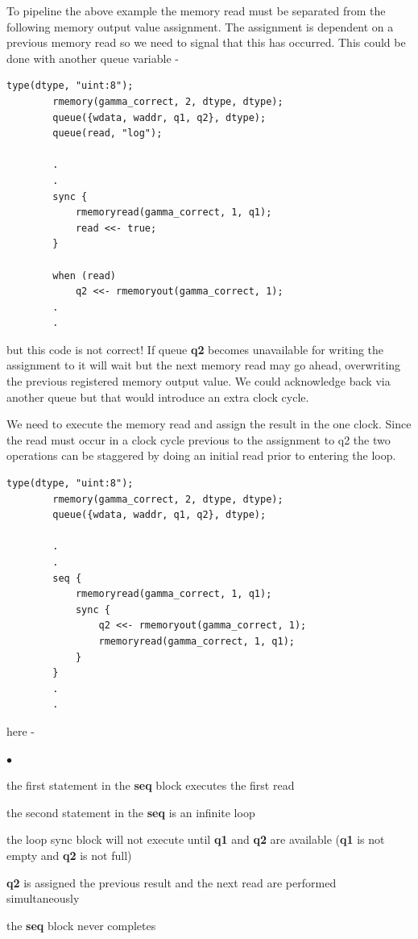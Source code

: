 \documentclass[10pt,a4paper,twoside,fleqn]{article}
\newcommand{\blist}{\begin{list}{$\bullet$}{\setlength{\itemsep}{-5pt}\setlength{\topsep}{-5pt}}}
\newcommand{\blend}{\end{list}}
\newcommand{\var}[1]{{\bf #1}} %
\begin{document}
    To pipeline the above example the memory read must be separated from the
    following memory output value assignment. The assignment is dependent on
    a previous memory read so we need to signal that this has occurred. This
    could be done with another queue variable -
    \begin{lstlisting}[language=threepl]
        type(dtype, "uint:8");
        rmemory(gamma_correct, 2, dtype, dtype);
        queue({wdata, waddr, q1, q2}, dtype);
        queue(read, "log");
                
        .
        .
        sync {
            rmemoryread(gamma_correct, 1, q1);
            read <<- true;
        }
        
        when (read)
            q2 <<- rmemoryout(gamma_correct, 1);
        .
        .
    \end{lstlisting}
    but this code is not correct! If queue \var{q2} becomes unavailable for
    writing the assignment to it will wait but the next memory read may go
    ahead, overwriting the previous registered memory output value. We could
    acknowledge back via another queue but that would introduce an extra clock
    cycle.
    
    We need to execute the memory read and assign the result in the one clock.
    Since the read must occur in a clock cycle previous to the assignment to q2
    the two operations can be staggered by doing an initial read prior to
    entering the loop.
    
    \begin{lstlisting}[language=threepl]
        type(dtype, "uint:8");
        rmemory(gamma_correct, 2, dtype, dtype);
        queue({wdata, waddr, q1, q2}, dtype);
                
        .
        .
        seq {
            rmemoryread(gamma_correct, 1, q1);
            sync {
                q2 <<- rmemoryout(gamma_correct, 1);
                rmemoryread(gamma_correct, 1, q1);
            }
        }
        .
        .
    \end{lstlisting}
    here -
    \blist
    \item   the first statement in the {\bf seq} block executes the first read
    \item   the second statement in the {\bf seq} is an infinite loop
    \item   the loop sync block will not execute until {\bf q1} and {\bf q2} are
            available ({\bf q1} is not empty and {\bf q2} is not full)
    \item   {\bf q2} is assigned the previous result and the next read are performed
            simultaneously
    \item   the {\bf seq} block never completes
    \blend
    
\end{document}
